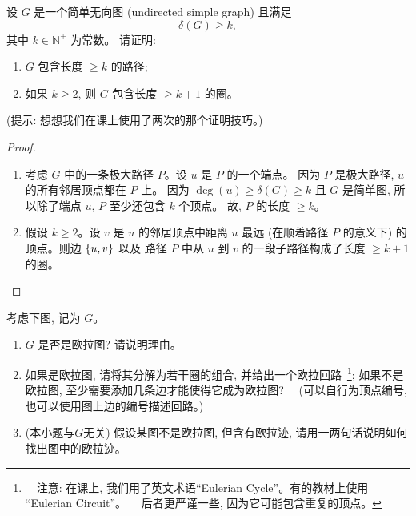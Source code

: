 \documentclass[a4paper, justified]{tufte-handout}
\begin{document}
\begin{problem}[\score{4 = 2 + 2} $\star\star\star$]
  设 $G$ 是一个简单无向图 (undirected simple graph) 且满足
  \[
    \delta(G) \ge k,
  \]
  其中 $k \in \mathbb{N}^{+}$ 为常数。
  请证明:
  \begin{enumerate}[(1)]
    \item $G$ 包含长度 $\ge k$ 的路径;
    \item 如果 $k \ge 2$, 则 $G$ 包含长度 $\ge k + 1$ 的圈。
  \end{enumerate}

  \vspace{1em}
  \noindent (提示: 想想我们在课上使用了两次的那个证明技巧。)
\end{problem}

\begin{proof}
  \begin{enumerate}[(1)]
    \item 考虑 $G$ 中的一条极大路径 $P$。设 $u$ 是 $P$ 的一个端点。
      因为 $P$ 是极大路径, $u$ 的所有邻居顶点都在 $P$ 上。
      因为 $\deg(u) \ge \delta(G) \ge k$ 且 $G$ 是简单图,
      所以除了端点 $u$, $P$ 至少还包含 $k$ 个顶点。
      故, $P$ 的长度 $\ge k$。
    \item 假设 $k \ge 2$。设 $v$ 是 $u$ 的邻居顶点中距离 $u$ 最远
      (在顺着路径 $P$ 的意义下) 的顶点。则边 $\{u, v\}$ 以及
      路径 $P$ 中从 $u$ 到 $v$ 的一段子路径构成了长度 $\ge k + 1$ 的圈。
  \end{enumerate}
\end{proof}

\begin{problem}[\score{4 = 1 + 2 + 1} $\star\star$]
  考虑下图, 记为 $G$。
  \begin{enumerate}[(1)]
    \item $G$ 是否是欧拉图? 请说明理由。
    \item 如果是欧拉图, 请将其分解为若干圈的组合, 并给出一个欧拉回路~\footnote{
    　注意: 在课上, 我们用了英文术语``Eulerian Cycle''。有的教材上使用 ``Eulerian Circuit''。
    　后者更严谨一些, 因为它可能包含重复的顶点。};
      如果不是欧拉图, 至少需要添加几条边才能使得它成为欧拉图?
    　(可以自行为顶点编号, 也可以使用图上边的编号描述回路。)
    \item (本小题与$G$无关) 假设某图不是欧拉图, 但含有欧拉迹,
      请用一两句话说明如何找出图中的欧拉迹。
  \end{enumerate}
\end{problem}
\end{document}
